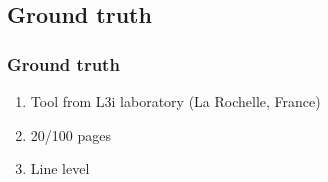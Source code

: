\documentclass[9pt]{beamer}
\begin{document}
	\subsection[Ground truth]{Ground truth}
	\begin{frame}
		\frametitle{Ground truth}
		\begin{center}	
		  \vspace{1em}
		\end{center}
		\begin{block}{}
			\begin{enumerate}
				\item Tool from L3i laboratory (La Rochelle, France)
				\item 20/100 pages
				\item Line level
			\end{enumerate}				
		\end{block}
		

	\end{frame}

\end{document}
